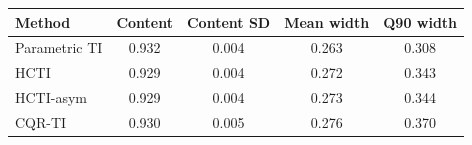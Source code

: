 \begin{tabular}{lcccc}
\toprule
Method & Content & Content SD & Mean width & Q90 width \\
\midrule
Parametric TI & 0.932 & 0.004 & 0.263 & 0.308 \\
HCTI & 0.929 & 0.004 & 0.272 & 0.343 \\
HCTI-asym & 0.929 & 0.004 & 0.273 & 0.344 \\
CQR-TI & 0.930 & 0.005 & 0.276 & 0.370 \\
\bottomrule
\end{tabular}